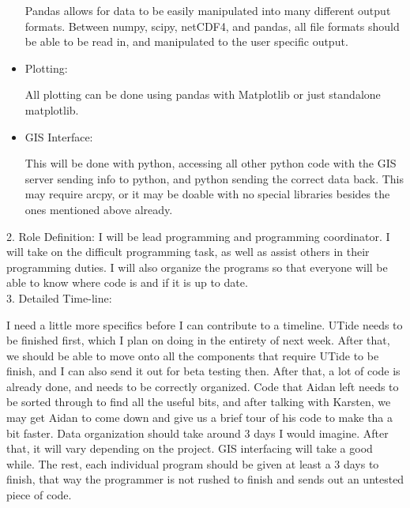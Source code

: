 \documentclass[12pt]{article}
\theoremstyle{definition}
\begin{document}
\begin{itemize}
                Pandas allows for data to be easily manipulated into many
                different output formats. Between numpy, scipy, netCDF4, and
                pandas, all file formats should be able to be read in, and
                manipulated to the user specific output.

            \item Plotting:

                All plotting can be done using pandas with Matplotlib or just
                standalone matplotlib.

            \item GIS Interface:

                This will be done with python, accessing all other python code
                with the GIS server sending info to python, and python sending
                the correct data back. This may require arcpy, or it may be
                doable with no special libraries besides the ones mentioned
                above already.



        \end{itemize}

    2. Role Definition: I will be lead programming and programming coordinator.
    I will take on the difficult programming task, as well as assist others in
    their programming duties. I will also organize the programs so that
    everyone will be able to know where code is and if it is up to date. \\

    3. Detailed Time-line:

        I need a little more specifics before I can contribute to a timeline.
        UTide needs to be finished first, which I plan on doing in the entirety
        of next week. After that, we should be able to move onto all the
        components that require UTide to be finish, and I can also send it out
        for beta testing then. After that, a lot of code is already done, and
        needs to be correctly organized. Code that Aidan left needs to be
        sorted through to find all the useful bits, and after talking with
        Karsten, we may get Aidan to come down and give us a brief tour of his
        code to make tha a bit faster. Data organization should take around 3
        days I would imagine. After that, it will vary depending on the
        project. GIS interfacing will take a good while. The rest, each
        individual program should be given at least a 3 days to finish, that
        way the programmer is not rushed to finish and sends out an untested
        piece of code.
\end{document}
